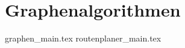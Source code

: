 
\part{Graphenalgorithmen}
\label{part-graphenalgorithmen}

{graphen_main.tex}
{routenplaner_main.tex}

